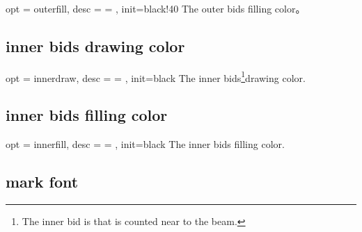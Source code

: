 \documentclass[full]{l3doc}
\begin{document}
\begin{documentation}
\begin{option}{ opt = outerfill, desc = {= }, init=black!40 }
  The outer bids filling color。
\end{option}

\begin{SideBySideExample}[frame=single,numbers=left,%
                xrightmargin=.37\linewidth,gobble=2]
  \centering
  \begin{suanpan}
  \end{suanpan}
\end{SideBySideExample}

\subsection{inner bids drawing color}

\begin{option}{ opt = innerdraw, desc = {= }, init=black }
  The inner bids\footnote{The inner bid is that is counted near to the beam.}drawing color.
\end{option}

\begin{SideBySideExample}[frame=single,numbers=left,%
                xrightmargin=.37\linewidth,gobble=2]
  \centering
  \begin{suanpan}
  \end{suanpan}
\end{SideBySideExample}

\subsection{inner bids filling color}

\begin{option}{ opt = innerfill, desc = {= }, init=black}
  The inner bids filling color.
\end{option}

\begin{SideBySideExample}[frame=single,numbers=left,%
                xrightmargin=.37\linewidth,gobble=2]
  \centering
  \begin{suanpan}
  \end{suanpan}
\end{SideBySideExample}

\subsection{mark font}


\end{documentation}
\end{document}
